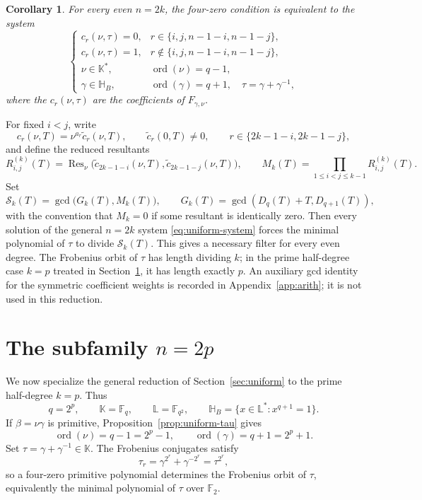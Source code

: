 \documentclass[11pt]{article}
\newtheorem{corollary}[theorem]{Corollary}
\theoremstyle{definition}
\theoremstyle{remark}
\begin{document}
\begin{corollary}\label{cor:uniform-system}
For every even \(n=2k\), the four-zero condition is equivalent to the system
\begin{equation}\label{eq:uniform-system}
\begin{cases}
c_r(\nu,\tau)=0, & r\in\{i,j,n-1-i,n-1-j\},\\
c_r(\nu,\tau)=1, & r\notin\{i,j,n-1-i,n-1-j\},\\
\nu\in\mathbb K^*,& \operatorname{ord}(\nu)=q-1,\\
\gamma\in \mathbb H_B,& \operatorname{ord}(\gamma)=q+1,\quad \tau=\gamma+\gamma^{-1},
\end{cases}
\end{equation}
where the \(c_r(\nu,\tau)\) are the coefficients of \(F_{\gamma,\nu}\).
\end{corollary}

For fixed \(i<j\), write
\[
c_r(\nu,T)=\nu^{a_r}\tilde c_r(\nu,T),
\qquad \tilde c_r(0,T)\neq0,
\qquad r\in\{2k-1-i,2k-1-j\},
\]
and define the reduced resultants
\[
R^{(k)}_{i,j}(T)=
\operatorname{Res}_{\nu}\bigl(\tilde c_{2k-1-i}(\nu,T),
\tilde c_{2k-1-j}(\nu,T)\bigr),
\qquad
M_k(T)=\prod_{1\le i<j\le k-1}R^{(k)}_{i,j}(T).
\]
Set
\[
\mathcal S_k(T)=\gcd\bigl(G_k(T),M_k(T)\bigr),
\qquad
G_k(T)=\gcd(D_q(T)+T,D_{q+1}(T)),
\]
with the convention that \(M_k=0\) if some resultant is identically zero. Then every solution of the general \(n=2k\) system \eqref{eq:uniform-system} forces the minimal polynomial of \(\tau\) to divide \(\mathcal S_k(T)\). This gives a necessary filter for every even degree. The Frobenius orbit of \(\tau\) has length dividing \(k\); in the prime half-degree case \(k=p\) treated in Section~\ref{sec:2p}, it has length exactly \(p\). An auxiliary gcd identity for the symmetric coefficient weights is recorded in Appendix~\ref{app:arith}; it is not used in this reduction.

\section{The subfamily \texorpdfstring{$n=2p$}{n=2p}}
\label{sec:2p}

We now specialize the general reduction of Section~\ref{sec:uniform} to the prime half-degree \(k=p\). Thus
\[
q=2^p,\qquad
\mathbb K=\mathbb F_q,\qquad
\mathbb L=\mathbb F_{q^2},\qquad
\mathbb H_B=\{x\in\mathbb L^*:x^{q+1}=1\}.
\]
If \(\beta=\nu\gamma\) is primitive, Proposition~\ref{prop:uniform-tau} gives
\[
\operatorname{ord}(\nu)=q-1=2^p-1,
\qquad
\operatorname{ord}(\gamma)=q+1=2^p+1.
\]
Set \(\tau=\gamma+\gamma^{-1}\in\mathbb K\). The Frobenius conjugates satisfy
\[
\tau_r=\gamma^{2^r}+\gamma^{-2^r}=\tau^{2^r},
\]
so a four-zero primitive polynomial determines the Frobenius orbit of \(\tau\), equivalently the minimal polynomial of \(\tau\) over \(\mathbb F_2\).
\end{document}

